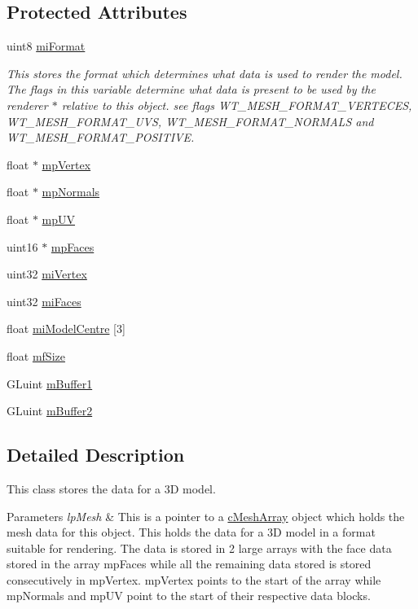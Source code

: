 \subsection*{Protected Attributes}
\begin{DoxyCompactItemize}
\item 
uint8 \hyperlink{classc_mesh_a6a9c96e41eef3faed3c43ab69e8be5c6}{miFormat}
\begin{DoxyCompactList}\small\item\em This stores the format which determines what data is used to render the model. The flags in this variable determine what data is present to be used by the renderer $\ast$ relative to this object. see flags WT\_\-MESH\_\-FORMAT\_\-VERTECES, WT\_\-MESH\_\-FORMAT\_\-UVS, WT\_\-MESH\_\-FORMAT\_\-NORMALS and WT\_\-MESH\_\-FORMAT\_\-POSITIVE. \item\end{DoxyCompactList}\item 
float $\ast$ \hyperlink{classc_mesh_a57db8cac8c3af0a47aec90d64cd8b582}{mpVertex}
\item 
float $\ast$ \hyperlink{classc_mesh_a84d273677bbeb936a53b60853d036321}{mpNormals}
\item 
float $\ast$ \hyperlink{classc_mesh_a631948d3ab58799de048697800d354ce}{mpUV}
\item 
uint16 $\ast$ \hyperlink{classc_mesh_af8a4896437c76d1a858fe5474ae9b5a3}{mpFaces}
\item 
uint32 \hyperlink{classc_mesh_a39c398b0ee0776f87a0ae9d7086ffa07}{miVertex}
\item 
uint32 \hyperlink{classc_mesh_ab740f62d6b44cc814481197be7669a3b}{miFaces}
\item 
float \hyperlink{classc_mesh_a98f60437f290f6476170b765aea19a91}{miModelCentre} \mbox{[}3\mbox{]}
\item 
float \hyperlink{classc_mesh_a15202141e9b35f71708fc0f35182f261}{mfSize}
\item 
GLuint \hyperlink{classc_mesh_a5de7b00f4575c394fe1fbcb0f15ef020}{mBuffer1}
\item 
GLuint \hyperlink{classc_mesh_aa24b95dee85706686fc1d46d34bc88ae}{mBuffer2}
\end{DoxyCompactItemize}


\subsection{Detailed Description}
This class stores the data for a 3D model. 
\begin{DoxyParams}{Parameters}
{\em lpMesh} & This is a pointer to a \hyperlink{classc_mesh_array}{cMeshArray} object which holds the mesh data for this object. This holds the data for a 3D model in a format suitable for rendering. The data is stored in 2 large arrays with the face data stored in the array mpFaces while all the remaining data stored is stored consecutively in mpVertex. mpVertex points to the start of the array while mpNormals and mpUV point to the start of their respective data blocks. \\
\hline
\end{DoxyParams}


